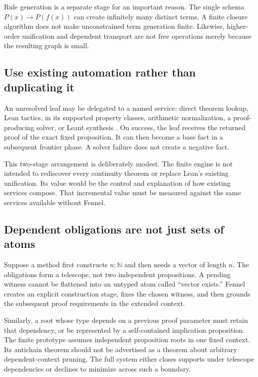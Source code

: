 \documentclass[11pt,a4paper]{article}
\theoremstyle{definition}
\theoremstyle{remark}
\newcommand{\code}[1]{\texttt{\detokenize{#1}}}
\newcommand{\NN}{\mathbb N}
\begin{document}
Rule generation is a separate stage for an important reason. The single schema
$P(x)\to P(f(x))$ can create infinitely many distinct terms. A finite closure
algorithm does not make unconstrained term generation finite. Likewise,
higher-order unification and dependent transport are not free operations merely
because the resulting graph is small.

\subsection{Use existing automation rather than duplicating it}
An unresolved leaf may be delegated to a named service: direct theorem lookup,
Lean tactics, \code{fun_prop} in its supported property classes, arithmetic
normalization, a proof-producing solver, or Leant synthesis
\cite{funprop,leanTactics,leantV}. On success, the leaf receives the returned
proof of the exact fixed proposition. It can then become a base fact in a
subsequent frontier phase. A solver failure does not create a negative fact.

This two-stage arrangement is deliberately modest. The finite engine is not
intended to rediscover every continuity theorem or replace Lean's existing
unification. Its value would be the control and explanation of how existing
services compose. That incremental value must be measured against the same
services available without Fennel.

\subsection{Dependent obligations are not just sets of atoms}
Suppose a method first constructs $n:\NN$ and then needs a vector of length $n$.
The obligations form a telescope, not two independent propositions. A pending
witness cannot be flattened into an untyped atom called ``vector exists.''
Fennel creates an explicit construction stage, fixes the chosen witness, and
then grounds the subsequent proof requirements in the extended context.

Similarly, a root whose type depends on a previous proof parameter must retain
that dependency, or be represented by a self-contained implication proposition.
The finite prototype assumes independent proposition roots in one fixed
context. Its antichain theorem should not be advertised as a theorem about
arbitrary dependent-context pruning. The full system either closes supports
under telescope dependencies or declines to minimize across such a boundary.
\end{document}
